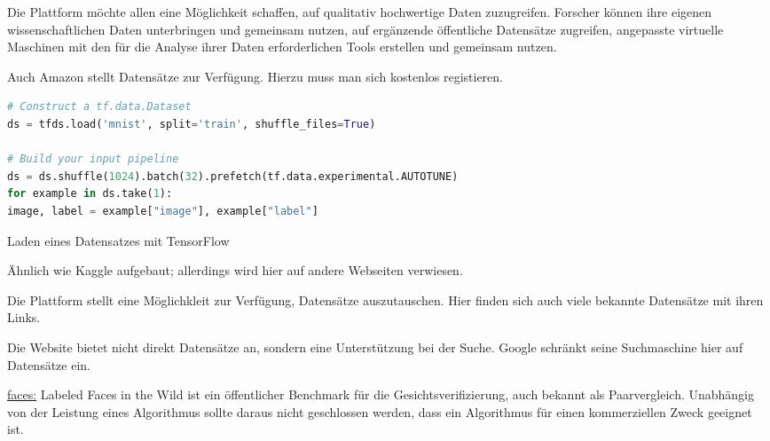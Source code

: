 {\begin{description}
  \item [\href{https://www.opensciencedatacloud.org}{Open Science Data Cloud:}] Die Plattform möchte allen eine Möglichkeit schaffen, auf qualitativ hochwertige Daten zuzugreifen. Forscher können ihre eigenen wissenschaftlichen Daten unterbringen und gemeinsam nutzen, auf ergänzende öffentliche Datensätze zugreifen, angepasste virtuelle Maschinen mit den für die Analyse ihrer Daten erforderlichen Tools erstellen und gemeinsam nutzen.
  
  \item[\href{http://aws.amazon.com/de/datasets/}{Amazon:}] Auch Amazon stellt Datensätze zur Verfügung. Hierzu muss man sich kostenlos registieren.
  
  \begin{code}
    \begin{lstlisting}[language=python]
# Construct a tf.data.Dataset
ds = tfds.load('mnist', split='train', shuffle_files=True)

# Build your input pipeline
ds = ds.shuffle(1024).batch(32).prefetch(tf.data.experimental.AUTOTUNE)
for example in ds.take(1):
image, label = example["image"], example["label"]
    \end{lstlisting}
    \caption{Laden eines Datensatzes mit TensorFlow}
  \end{code}


  \item [\href{https://www.kdnuggets.com/datasets}{KDnuggets.com:}] Ähnlich wie Kaggle aufgebaut; allerdings wird hier auf andere Webseiten verwiesen.
  \item [\href{https://paperswithcode.com/datasetss}{paperswithcode.com:}] Die Plattform stellt eine Möglichkleit zur Verfügung, Datensätze auszutauschen. Hier finden sich auch viele bekannte Datensätze mit ihren Links.
  \item [\href{https://datasetsearch.research.google.com}{Google Dataset Search:}] Die Website bietet nicht direkt Datensätze an, sondern eine Unterstützung bei der Suche. Google schränkt seine Suchmaschine hier auf Datensätze ein.

  \item \href{http://vis-www.cs.umass.edu/lfw/}{faces:} Labeled Faces in the Wild ist ein öffentlicher Benchmark für die Gesichtsverifizierung, auch bekannt als Paarvergleich. Unabhängig von der Leistung eines Algorithmus sollte daraus nicht geschlossen werden, dass ein Algorithmus für einen kommerziellen Zweck geeignet ist.


\end{description}




}






